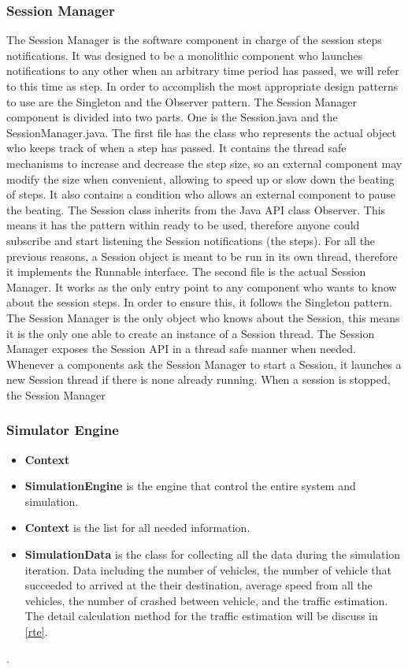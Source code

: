\documentclass[11pt]{article}
\begin{document}
\subsubsection{Session Manager}
The Session Manager is the software component in charge of the session steps notifications. 
It was designed to be a monolithic component who launches notifications to any other when an arbitrary time period has passed, we will refer to this time as step. In order to accomplish the most appropriate design patterns to use are the Singleton and the Observer pattern.
The Session Manager component is divided into two parts. One is the Session.java and the SessionManager.java. 
The first file has the class who represents the actual object who keeps track of when a step has passed. It contains the thread safe mechanisms to increase and decrease the step size, so an external component may modify the size when convenient, allowing to speed up or slow down the beating of steps. It also contains a condition who allows an external component to pause the beating. The Session class inherits from the Java API class Observer. This means it has the pattern within ready to be used, therefore anyone could subscribe and start listening the Session notifications (the steps). For all the previous reasons, a Session object is meant to be run in its own thread, therefore it implements the Runnable interface.
The second file is the actual Session Manager. It works as the only entry point to any component who wants to know about the session steps. In order to ensure this, it follows the Singleton pattern. The Session Manager is the only object who knows about the Session, this means it is the only one able to create an instance of a Session thread. The Session Manager exposes the Session API in a thread safe manner when needed. Whenever a components ask the Session Manager to start a Session, it launches a new Session thread if there is none already running. When a session is stopped, the Session Manager


\subsubsection{Simulator Engine}
        
\begin{itemize}[noitemsep]
\item \textbf{Context} 
\item \textbf{SimulationEngine} is the engine that control the entire system and simulation.
\item \textbf{Context} is the list for all needed information.
\item \textbf{SimulationData} is the class for collecting all the data during the simulation iteration. Data including the number of vehicles, the number of vehicle that succeeded to arrived at the their destination, average speed from all the vehicles, the number of crashed between vehicle, and the traffic estimation. The detail calculation method for the traffic estimation will be discuss in \ref{rte}.
\end{itemize}.
\end{document}
